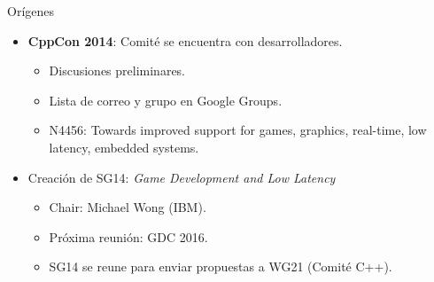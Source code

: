 \begin{frame}[t]{Orígenes}
\begin{itemize}
  \item \textbf{CppCon 2014}: Comité se encuentra con desarrolladores.
    \begin{itemize}
      \item Discusiones preliminares.
      \item Lista de correo y grupo en Google Groups.
      \item N4456: Towards improved support for games, graphics, real-time, low latency, embedded systems.
    \end{itemize}
  \vfill\pause
  \item Creación de SG14: \emph{Game Development and Low Latency}
    \begin{itemize}
      \item Chair: Michael Wong (IBM).
      \item Próxima reunión: GDC 2016.
      \item SG14 se reune para enviar propuestas a WG21 (Comité C++).
    \end{itemize}
\end{itemize}
\end{frame}

